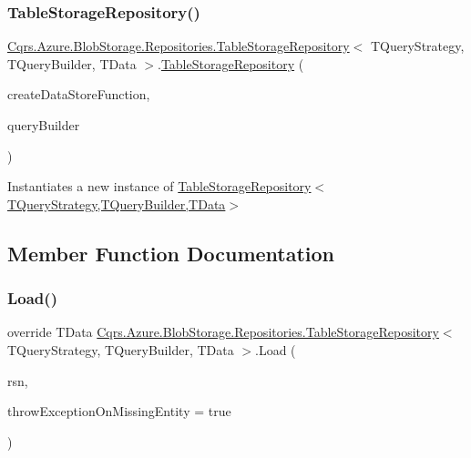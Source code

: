 \subsubsection{\texorpdfstring{Table\+Storage\+Repository()}{TableStorageRepository()}}
{\footnotesize\ttfamily \hyperlink{classCqrs_1_1Azure_1_1BlobStorage_1_1Repositories_1_1TableStorageRepository}{Cqrs.\+Azure.\+Blob\+Storage.\+Repositories.\+Table\+Storage\+Repository}$<$ T\+Query\+Strategy, T\+Query\+Builder, T\+Data $>$.\hyperlink{classCqrs_1_1Azure_1_1BlobStorage_1_1Repositories_1_1TableStorageRepository}{Table\+Storage\+Repository} (\begin{DoxyParamCaption}\item[{Func$<$ \hyperlink{interfaceCqrs_1_1DataStores_1_1IDataStore}{I\+Data\+Store}$<$ T\+Data $>$$>$}]{create\+Data\+Store\+Function,  }\item[{T\+Query\+Builder}]{query\+Builder }\end{DoxyParamCaption})}



Instantiates a new instance of \hyperlink{classCqrs_1_1Azure_1_1BlobStorage_1_1Repositories_1_1TableStorageRepository_a2c98507c1cdd4ed740a8d881a4e779e1_a2c98507c1cdd4ed740a8d881a4e779e1}{Table\+Storage\+Repository$<$\+T\+Query\+Strategy,\+T\+Query\+Builder,\+T\+Data$>$} 



\subsection{Member Function Documentation}
\mbox{\label{classCqrs_1_1Azure_1_1BlobStorage_1_1Repositories_1_1TableStorageRepository_a7238452f19c9d51b5733df7701920605_a7238452f19c9d51b5733df7701920605}} 
\subsubsection{\texorpdfstring{Load()}{Load()}}
{\footnotesize\ttfamily override T\+Data \hyperlink{classCqrs_1_1Azure_1_1BlobStorage_1_1Repositories_1_1TableStorageRepository}{Cqrs.\+Azure.\+Blob\+Storage.\+Repositories.\+Table\+Storage\+Repository}$<$ T\+Query\+Strategy, T\+Query\+Builder, T\+Data $>$.Load (\begin{DoxyParamCaption}\item[{Guid}]{rsn,  }\item[{bool}]{throw\+Exception\+On\+Missing\+Entity = {\ttfamily true} }\end{DoxyParamCaption})\hspace{0.3cm}{\ttfamily [virtual]}}



